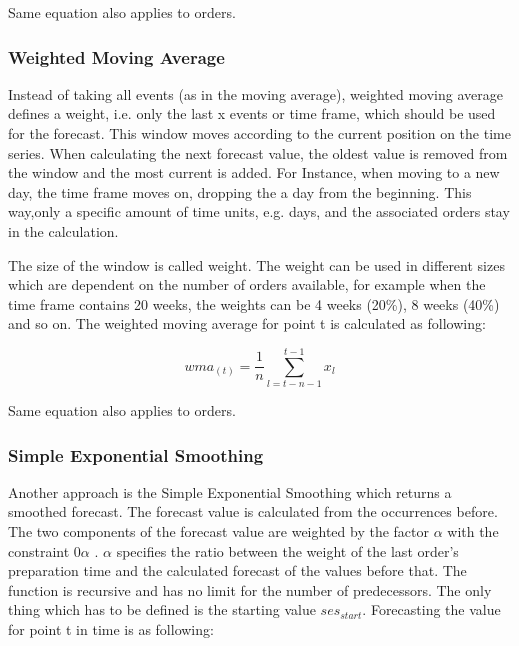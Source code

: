 Same equation also applies to orders.

\subsubsection{Weighted Moving Average}\label{subsubsection:Weighted Moving Average}
Instead of taking all events (as in the moving average), weighted moving average defines a weight, i.e. only the last x events or time frame, which should be used for the forecast. This window moves according to the current position on the time series. When calculating the next forecast value, the oldest value is removed from the window and the most current is added. For Instance, when moving to a new day, the time frame moves on, dropping the a day from the beginning. This way,only a specific amount of time units, e.g. days, and the associated orders stay in the calculation.


The size of the window is called weight. The weight can be used in different sizes which are dependent on the number of orders available, for example when the time frame contains 20 weeks, the weights can be 4 weeks (20\%), 8 weeks (40\%) and so on.\newline
The weighted moving average for point t is calculated as following:

\begin{center}
\begin{equation}
wma_{(t)}= \frac{1}{n}\sum^{t-1}_{l = t-n-1} x_{l}
\end{equation}
\end{center}
Same equation also applies to orders.

\subsubsection{Simple Exponential Smoothing}\label{subsubsection:Simple Exponential Smoothing}
Another approach is the Simple Exponential Smoothing which returns a smoothed forecast. The forecast value is calculated from the occurrences before. The two components of the forecast value are weighted by the factor $\alpha$ with the constraint 0\le $\alpha$ . $\alpha$ specifies the ratio between the weight of the last order's preparation time and the calculated forecast of the values before that. The function is recursive and has no limit for the number of predecessors. The only thing which has to be defined is the starting value $ses_{start}$.\newline
Forecasting the value for point t in time is as following:


